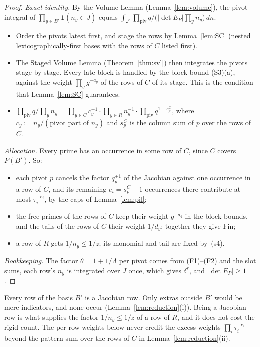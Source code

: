 \begin{proof}
\emph{Exact identity.} By the Volume Lemma (Lemma~\ref{lem:volume}), the pivot-integral of $\prod_{y\in B'}\mathbf 1(n_y\in J)$
equals $\int_{J^r}\prod_{\mathrm{piv}}q\big/\big(|\det E_P|\prod_yn_y\big)\,dn$.
\begin{itemize}
\item Order the pivots latest first, and stage the rows by Lemma~\ref{lem:SC} (nested lexicographically-first bases with the
  rows of $C$ listed first).
\item The Staged Volume Lemma (Theorem~\ref{thm:svl}) then integrates the pivots stage by stage. Every late block is
  handled by the block bound (S3)(a), against the weight $\prod_gg^{-a_g}$ of the rows of $C$ of its stage. This is the
  condition that Lemma~\ref{lem:SC} guarantees.
\item $\prod_{\mathrm{piv}}q/\prod_yn_y=\prod_{y\in C}c_y^{-1}\cdot\prod_{y\in R}n_y^{-1}\cdot\prod_{\mathrm{piv}}q^{1-s^C_p}$,
  where $c_y:=n_y/(\text{pivot part of }n_y)$ and $s^C_p$ is the column sum of $p$ over the rows of $C$.
\end{itemize}

\emph{Allocation.} Every prime has an occurrence in some row of $C$, since $C$ covers $P(B')$. So:
\begin{itemize}
\item each pivot $p$ cancels the factor $q_p^{+1}$ of the Jacobian against one occurrence in a row of $C$, and its
  remaining $e_i=s^C_p-1$ occurrences there contribute at most $\tau_i^{-e_i}$, by the caps of Lemma~\ref{lem:pil};
\item the free primes of the rows of $C$ keep their weight $g^{-a_g}$ in the block bounds, and the tails of the rows of
  $C$ their weight $1/d_y$; together they give $\mathrm{Fin}$;
\item a row of $R$ gets $1/n_y\le1/z$; its monomial and tail are fixed by~(s4).
\end{itemize}

\emph{Bookkeeping.} The factor $\theta=1+1/\Lambda$ per pivot comes from (F1)--(F2) and the slot sums, each row's $n_y$ is
integrated over $J$ once, which gives $\delta^r$, and $|\det E_P|\ge1$.
\end{proof}

\begin{remark}\label{rem:jacobianrows}
Every row of the basis $B'$ is a Jacobian row. Only extras outside $B'$ would be mere indicators, and none occur
(Lemma~\ref{lem:reduction}(i)). Being a Jacobian row is what supplies the factor $1/n_y\le1/z$ of a row of $R$, and it does not
cost the rigid count. The per-row weights below never credit the excess weights $\prod_i\tau_i^{-e_i}$ beyond the pattern sum over
the rows of $C$ in Lemma~\ref{lem:reduction}(ii).
\end{remark}

